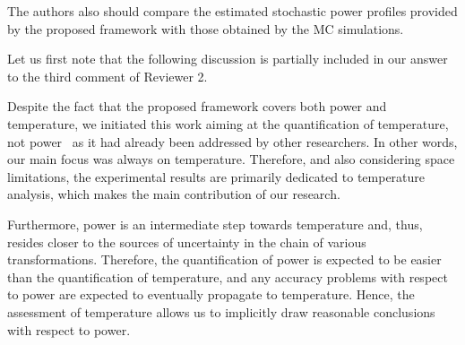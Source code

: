 \begin{authors}
\begin{actions}
\end{actions}
\end{authors}

\begin{reviewer}
The authors also should compare the estimated stochastic power profiles provided by the proposed framework with those obtained by the MC simulations.
\end{reviewer}
\begin{authors}
Let us first note that the following discussion is partially included in our answer to the third comment of Reviewer 2.

Despite the fact that the proposed framework covers both power and temperature, we initiated this work aiming at the quantification of temperature, not power \perse\ as it had already been addressed by other researchers.
In other words, our main focus was always on temperature.
Therefore, and also considering space limitations, the experimental results are primarily dedicated to temperature analysis, which makes the main contribution of our research.

Furthermore, power is an intermediate step towards temperature and, thus, resides closer to the sources of uncertainty in the chain of various transformations.
Therefore, the quantification of power is expected to be easier than the quantification of temperature, and any accuracy problems with respect to power are expected to eventually propagate to temperature.
Hence, the assessment of temperature allows us to implicitly draw reasonable conclusions with respect to power.

\begin{actions}
\end{actions}
\end{authors}

